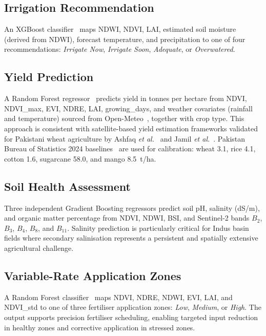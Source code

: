 \documentclass[conference]{IEEEtran}
\begin{document}
\subsection{Irrigation Recommendation}

An XGBoost classifier~\cite{chen2016xgboost} maps NDWI, NDVI, LAI,
estimated soil moisture (derived from NDWI), forecast temperature, and
precipitation to one of four recommendations: \textit{Irrigate Now},
\textit{Irrigate Soon}, \textit{Adequate}, or \textit{Overwatered}.

\subsection{Yield Prediction}

A Random Forest regressor~\cite{breiman2001} predicts yield in tonnes per
hectare from NDVI, NDVI\_max, EVI, NDRE, LAI, growing\_days, and weather
covariates (rainfall and temperature) sourced from
Open-Meteo~\cite{zippenfenig2023}, together with crop type. This approach is
consistent with satellite-based yield estimation frameworks validated for
Pakistani wheat agriculture by Ashfaq \textit{et al.}~\cite{ashfaq2025} and
Jamil \textit{et al.}~\cite{jamil2025}.
Pakistan Bureau of Statistics 2024 baselines~\cite{pbs2024} are used for
calibration: wheat 3.1, rice 4.1, cotton 1.6, sugarcane 58.0, and
mango 8.5~t/ha.

\subsection{Soil Health Assessment}

Three independent Gradient Boosting regressors predict soil pH, salinity
(dS/m), and organic matter percentage from NDVI, NDWI, BSI, and Sentinel-2
bands $B_2$, $B_3$, $B_4$, $B_8$, and $B_{11}$. Salinity prediction is
particularly critical for Indus basin fields where secondary salinisation
represents a persistent and spatially extensive agricultural challenge.

\subsection{Variable-Rate Application Zones}

A Random Forest classifier~\cite{breiman2001} maps NDVI, NDRE, NDWI, EVI,
LAI, and NDVI\_std to one of three fertiliser application zones:
\textit{Low}, \textit{Medium}, or \textit{High}. The output supports precision
fertiliser scheduling, enabling targeted input reduction in healthy zones and
corrective application in stressed zones.
\end{document}
